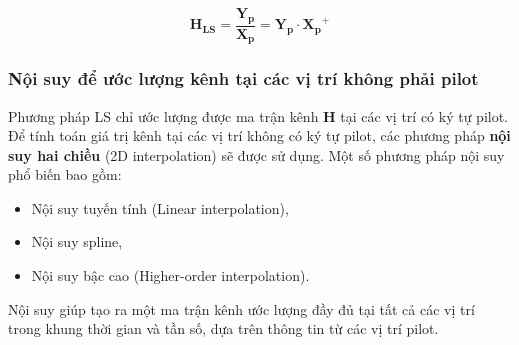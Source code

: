 \begin{equation}
    \bm{H_{LS}} = \frac{\bm{Y_p}}{\bm{X_p}} = \bm{Y_p} \cdot \bm{X_p}^{+}
\end{equation}

\subsubsection{Nội suy để ước lượng kênh tại các vị trí không phải pilot}

Phương pháp LS chỉ ước lượng được ma trận kênh \( \bm{H} \) tại các vị trí có ký tự pilot. 
Để tính toán giá trị kênh tại các vị trí không có ký tự pilot, các phương pháp \textbf{nội suy hai chiều} (2D interpolation) sẽ được sử dụng. 
Một số phương pháp nội suy phổ biến bao gồm:

\begin{itemize}
    \item Nội suy tuyến tính (Linear interpolation),
    \item Nội suy spline,
    \item Nội suy bậc cao (Higher-order interpolation).
\end{itemize}

Nội suy giúp tạo ra một ma trận kênh ước lượng đầy đủ tại tất cả các vị trí trong khung thời gian và tần số, dựa trên thông tin từ các vị trí pilot.